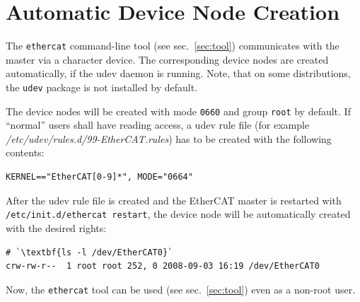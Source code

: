 \documentclass[a4paper,12pt,BCOR6mm,bibtotoc,idxtotoc]{scrbook}
\begin{document}
\section{Automatic Device Node Creation}
\label{sec:autonode}

The \lstinline+ethercat+ command-line tool (see sec.~\ref{sec:tool})
communicates with the master via a character device. The corresponding device
nodes are created automatically, if the udev daemon is running.  Note, that on
some distributions, the \lstinline+udev+ package is not installed by default.

The device nodes will be created with mode \lstinline+0660+ and group
\lstinline+root+ by default. If ``normal'' users shall have reading access, a
udev rule file (for example \textit{/etc/udev/rules.d/99-EtherCAT.rules}) has
to be created with the following contents:

\begin{lstlisting}
KERNEL=="EtherCAT[0-9]*", MODE="0664"
\end{lstlisting}

After the udev rule file is created and the EtherCAT master is restarted with
\lstinline[breaklines=true]+/etc/init.d/ethercat restart+, the device node
will be automatically created with the desired rights:

\begin{lstlisting}
# `\textbf{ls -l /dev/EtherCAT0}`
crw-rw-r--  1 root root 252, 0 2008-09-03 16:19 /dev/EtherCAT0
\end{lstlisting}

Now, the \lstinline+ethercat+ tool can be used (see sec.~\ref{sec:tool}) even
as a non-root user.

\end{document}
